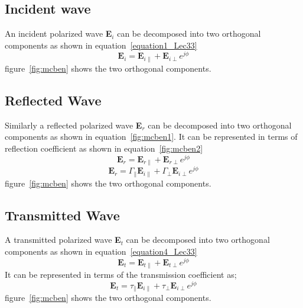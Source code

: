 \subsection{Incident wave}	
An incident polarized wave \textbf{E$_i$} can be decomposed into two orthogonal components as shown in equation~\ref{equation1_Lec33}	
\begin{equation}
\textbf{E}_i = \textbf{E}_{i\parallel} + \textbf{E}_{i\perp} e^{j\phi}
\label{equation1_Lec33}
\end{equation}
figure~\ref{fig:mcben} shows the two orthogonal components.	
\subsection{Reflected Wave}
Similarly a reflected polarized wave \textbf{E$_r$} can be decomposed into two orthogonal components as shown in equation~\ref{fig:mcben1}. It can be represented in terms of reflection coefficient as shown in equation~\ref{fig:mcben2}
\begin{equation}
\textbf{E}_r = \textbf{E}_{r\parallel} + \textbf{E}_{r\perp} e^{j\phi}
\end{equation}	
\begin{equation}
\textbf{E}_r = \Gamma_\parallel \textbf{E}_{i\parallel} + \Gamma_\perp \textbf{E}_{i\perp} e^{j\phi}
\end{equation}	
figure~\ref{fig:mcben} shows the two orthogonal components.

\subsection{Transmitted Wave}
A transmitted polarized wave \textbf{E$_t$} can be decomposed into two orthogonal components as shown in equation~\ref{equation4_Lec33}
\begin{equation}
\textbf{E}_t = \textbf{E}_{t\parallel} + \textbf{E}_{t\perp} e^{j\phi}
\label{equation4_Lec33}
\end{equation}
It can be represented in terms of the transmission coefficient as;	
\begin{equation}
\textbf{E}_t = \tau_\parallel \textbf{E}_{i\parallel} + \tau_\perp\textbf{E}_{i\perp} e^{j\phi}
\end{equation}	
figure~\ref{fig:mcben} shows the two orthogonal components.	

